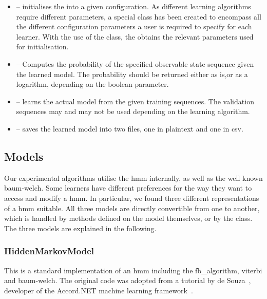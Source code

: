 \begin{itemize}
	\item[]  -- initialises the  into a given configuration. As different learning algorithms require different parameters, a special class  has been created to encompass all the different configuration parameters a user is required to specify for each learner. With the use of the  class, the  obtains the relevant parameters used for initialisation.
	\item[]  -- Computes the probability of the specified observable state sequence given the learned model. The probability should be returned either as is,or as a logarithm, depending on the boolean  parameter.
	\item[]  -- learns the actual model from the given training sequences. The validation sequences may and may not be used depending on the learning algorithm.
	\item[]  -- saves the learned model into two files, one in plaintext and one in \gls{csv}.
\end{itemize}

\subsection{Models}

Our experimental algorithms utilise the \acrlong{hmm} internally, as well as the well known \gls{baum-welch}.
Some learners have different preferences for the way they want to access and modify a \gls{hmm}.
In particular, we found three different representations of a \gls{hmm} suitable. All three models are directly convertible from one to another, which is handled by methods defined on the model themselves, or by the class. The three models are explained in the following.

\subsubsection{HiddenMarkovModel}

This is a standard implementation of an \gls{hmm} including the \gls{fb_algorithm}, \gls{viterbi} and \gls{baum-welch}. The original code was adopted from a tutorial by de Souza~\cite{desouza_hmm}, developer of the Accord.NET machine learning framework~\cite{accord_net}.

